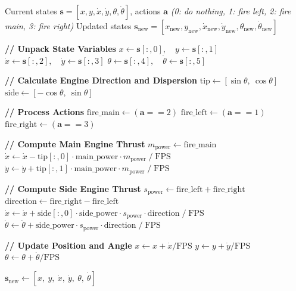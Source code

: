 \documentclass[nonacm,sigconf]{acmart}
\begin{document}
\begin{algorithm}[h]
\caption{Dynamics of Lunar Lander}
\label{alg:lunar_lander_dynamics}
\begin{algorithmic}[1]
\Require Current states
         $\mathbf{s} = [x, y, \dot{x}, \dot{y}, \theta, \dot{\theta}]$,
         actions $\mathbf{a}$
         \textit{(0: do nothing, 1: fire left, 2: fire main, 3: fire right)}
\Ensure  Updated states
         $\mathbf{s}_{\text{new}} =
         [x_{\text{new}}, y_{\text{new}},
          \dot{x}_{\text{new}}, \dot{y}_{\text{new}},
          \theta_{\text{new}}, \dot{\theta}_{\text{new}}]$

\State \textbf{// Unpack State Variables}
\State $x \gets \mathbf{s}[:,0],\quad y \gets \mathbf{s}[:,1]$
\State $\dot{x} \gets \mathbf{s}[:,2],\quad \dot{y} \gets \mathbf{s}[:,3]$
\State $\theta \gets \mathbf{s}[:,4],\quad \dot{\theta} \gets \mathbf{s}[:,5]$

\State \textbf{// Calculate Engine Direction and Dispersion}
\State $\text{tip}  \gets [\sin\theta,\ \cos\theta]$
\State $\text{side} \gets [-\cos\theta,\ \sin\theta]$

\State \textbf{// Process Actions}
\State $\text{fire\_main}  \gets (\mathbf{a} == 2)$
\State $\text{fire\_left}  \gets (\mathbf{a} == 1)$
\State $\text{fire\_right} \gets (\mathbf{a} == 3)$

\State \textbf{// Compute Main Engine Thrust}
\State $m_{\text{power}} \gets \text{fire\_main}$
\State $\dot{x} \gets \dot{x}
       - \text{tip}[:,0] \cdot \text{main\_power}
         \cdot m_{\text{power}} \;/\; \text{FPS}$
\State $\dot{y} \gets \dot{y}
       + \text{tip}[:,1] \cdot \text{main\_power}
         \cdot m_{\text{power}} \;/\; \text{FPS}$

\State \textbf{// Compute Side Engine Thrust}
\State $s_{\text{power}}  \gets \text{fire\_left} + \text{fire\_right}$
\State $\text{direction}  \gets \text{fire\_right} - \text{fire\_left}$
\State $\dot{x} \gets \dot{x}
       + \text{side}[:,0] \cdot \text{side\_power}
         \cdot s_{\text{power}} \cdot \text{direction} \;/\; \text{FPS}$
\State $\dot{\theta} \gets \dot{\theta}
       + \text{side\_power} \cdot s_{\text{power}}
         \cdot \text{direction} \;/\; \text{FPS}$

\State \textbf{// Update Position and Angle}
\State $x      \gets x      + \dot{x}      / \text{FPS}$
\State $y      \gets y      + \dot{y}      / \text{FPS}$
\State $\theta \gets \theta + \dot{\theta} / \text{FPS}$

\State \Return
       $\mathbf{s}_{\text{new}} \gets
       [x,\ y,\ \dot{x},\ \dot{y},\ \theta,\ \dot{\theta}]$
\end{algorithmic}
\end{algorithm}
\end{document}
